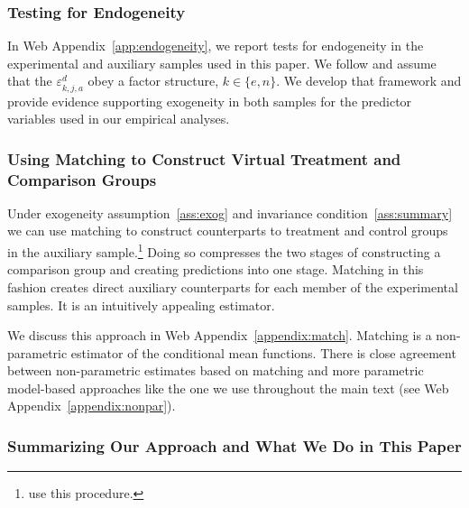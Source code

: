 \subsubsection{Testing for Endogeneity}\label{section:accendog}

In Web Appendix~\ref{app:endogeneity}, we report tests for endogeneity in the experimental and auxiliary samples used in this paper. We follow \citet{Heckman_Pinto_etal_2013_PerryFactor} and assume that the $\varepsilon_{k,j,a}^d$ obey a factor structure, $k \in \{e,n\}$. We develop that framework and provide evidence supporting exogeneity in both samples for the predictor variables used in our empirical analyses.

\subsubsection{Using Matching to Construct Virtual Treatment and Comparison Groups}\label{usingmatching}

Under exogeneity assumption~\ref{ass:exog} and invariance condition~\ref{ass:summary} we can use matching to construct counterparts to treatment and control groups in the auxiliary sample.\footnote{\citet{Heckman_Ichimura_etal_1998_Econometrica} use this procedure.} Doing so compresses the two stages of constructing a comparison group and creating predictions into one stage. Matching in this fashion creates direct auxiliary counterparts for each member of the experimental samples. It is an intuitively appealing estimator.

We discuss this approach in Web Appendix~\ref{appendix:match}. Matching is a non-parametric estimator of the conditional mean functions. There is close agreement between non-parametric estimates based on matching and more parametric model-based approaches like the one we use throughout the main text (see Web Appendix~\ref{appendix:nonpar}).

\subsubsection{Summarizing Our Approach and What We Do in This Paper}

